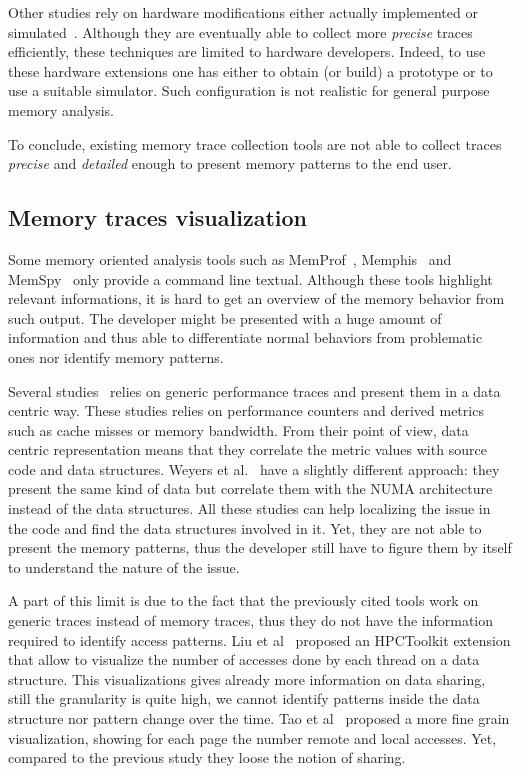 Other studies rely on hardware modifications either actually implemented or simulated~\cite{Bao08HMTT,Martonosi92MemSpy}.
Although they are eventually able to collect more \emph{precise} traces efficiently, these techniques are limited to hardware developers.
Indeed, to use these hardware extensions one has either to obtain (or build) a prototype or to use a suitable simulator.
Such configuration is not realistic for general purpose memory analysis.

To conclude, existing memory trace collection tools are not able to collect traces \emph{precise} and \emph{detailed} enough to present memory patterns to the end user.

\subsection{Memory traces visualization}

Some memory oriented analysis tools such as \gls{MemProf}~\cite{Lachaize12MemProf}, \gls{Memphis}~\cite{McCurdy10Memphis} and \gls{MemSpy}~\cite{Martonosi92MemSpy} only provide a command line textual.
Although these tools highlight relevant informations, it is hard to get an overview of the memory behavior from such output.
The developer might be presented with a huge amount of information and thus able to differentiate normal behaviors from problematic ones nor identify memory patterns.

Several studies~\cite{DeRose01Hardware,DeRose02SIGMA,Bosch00Rivet} relies on generic performance traces and present them in a data centric way.
These studies relies on performance counters and derived metrics such as cache misses or memory bandwidth.
From their point of view, data centric representation means that they correlate the metric values with source code and data structures.
Weyers et al.~\cite{Weyers14Visualization} have a slightly different approach: they present the same kind of data but correlate them with the \gls{NUMA} architecture instead of the data structures.
All these studies can help localizing the issue in the code and find the data structures involved in it.
Yet, they are not able to present the memory patterns, thus the developer still have to figure them by itself to understand the nature of the issue.

A part of this limit is due to the fact that the previously cited tools work on generic traces instead of memory traces, thus they do not have the information required to identify access patterns.
Liu et al~\cite{Liu13Datacentric,Liu14Tool} proposed an \gls{HPCToolkit} extension that allow to visualize the number of accesses done by each thread on a data structure.
This visualizations gives already more information on data sharing, still the granularity is quite high, we cannot identify patterns inside the data structure nor pattern change over the time.
Tao et al~\cite{Tao01Visualizing} proposed a more fine grain  visualization, showing for each page the number remote and local accesses.
Yet, compared to the previous study they loose the notion of sharing.

